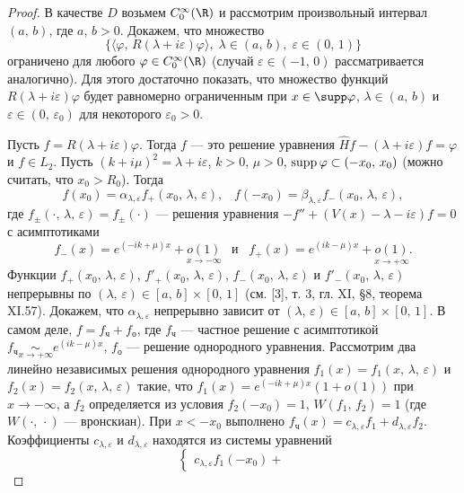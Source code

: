 \documentclass[a4paper
]{article}
\begin{document}
\begin{proof}
В качестве $D$ возьмем $C_0^\infty(\R)$ и рассмотрим произвольный
интервал $(a, \, b)$, где $a$, $b>0$. Докажем, что множество $$\{\langle
\varphi, \, R(\lambda+i\varepsilon)\varphi\rangle, \; \lambda\in (a, \, b),
\; \varepsilon \in (0, \, 1)\}$$ ограничено для любого $\varphi\in
C_0^\infty(\R)$ (случай $\varepsilon \in (-1, \, 0)$ рассматривается
аналогично). Для этого достаточно показать, что множество функций
$R(\lambda+i\varepsilon)\varphi$ будет равномерно ограниченным при
$x\in \supp \varphi$, $\lambda\in (a, \, b)$ и $\varepsilon \in
(0, \, \varepsilon_0)$ для некоторого $\varepsilon _0>0$. \par
Пусть $f=R(\lambda+i\varepsilon)\varphi$. Тогда $f$ --- это решение
уравнения $\hat H f-(\lambda +i\varepsilon)f=\varphi$ и $f\in L_2$.
Пусть $(k+i\mu)^2=\lambda+i\varepsilon$, $k>0$, $\mu>0$, ${\rm supp}\,
\varphi\subset (-x_0, \, x_0)$ (можно считать, что $x_0>R_0$).
Тогда $$f(x_0)=\alpha_{\lambda,\varepsilon}f_+(x_0, \, \lambda, \,
\varepsilon), \;\;\; f(-x_0)=\beta_{\lambda,\varepsilon} f_-(x_0, \, \lambda,
\, \varepsilon),$$ где $f_{\pm}(\cdot, \, \lambda, \, \varepsilon)=f_{\pm}
(\cdot)$ --- решения уравнения $-f''+(V(x)-\lambda-
i\varepsilon)f=0$ с асимптотиками $$f_-(x)=e^{(-ik+\mu)x}+\underset{x\rightarrow
-\infty}{o(1)} \;\;\; \text{и} \;\;\; f_+(x)=e^{(ik-\mu)x}+\underset{x\rightarrow +\infty}
{o(1)}.$$ Функции $f_+(x_0, \, \lambda, \, \varepsilon)$, $f'_+(x_0, \,
\lambda, \, \varepsilon)$, $f_-(x_0, \, \lambda, \, \varepsilon)$ и $f'_-(x_0,
\, \lambda, \, \varepsilon)$ непрерывны по $(\lambda, \, \varepsilon)
\in [a, \, b]\times [0, \, 1]$ (см. [3], т. 3, гл. XI, \S 8, теорема
XI.57). Докажем, что $\alpha_{\lambda,\varepsilon}$ непрерывно зависит от
$(\lambda, \, \varepsilon)\in [a, \, b]\times [0, \, 1]$. В самом деле,
$f=f_{\text{ч}}+f_{\text{о}}$, где $f_{\text{ч}}$ --- частное решение с асимптотикой
$f_{\text{ч}}\underset{x\rightarrow +\infty}{\sim} e^{(ik-\mu)x}$, $f_{\text{о}}$ --- решение
однородного уравнения. Рассмотрим два линейно независимых решения
однородного уравнения $f_1(x)=f_1(x, \, \lambda, \, \varepsilon)$ и
$f_2(x)=f_2(x, \, \lambda, \, \varepsilon)$ такие, что $f_1(x)=
e^{(-ik+\mu)x}(1+o(1))$ при $x\rightarrow -\infty$, а $f_2$ определяется
из условия $f_2(-x_0)=1$, $W(f_1, \, f_2)=1$ (где $W(\cdot, \, \cdot)$
--- вронскиан). При $x<-x_0$ выполнено $f_{\text{ч}}(x)=c_{\lambda,\varepsilon}f_1+
d_{\lambda,\varepsilon}f_2$. Коэффициенты $c_{\lambda,\varepsilon}$
и $d_{\lambda,\varepsilon}$ находятся из системы уравнений
$$\left\{ \begin{array}{l} c_{\lambda,\varepsilon}f_1(-x_0)+

\end{array}$$
\end{proof}
\end{document}
